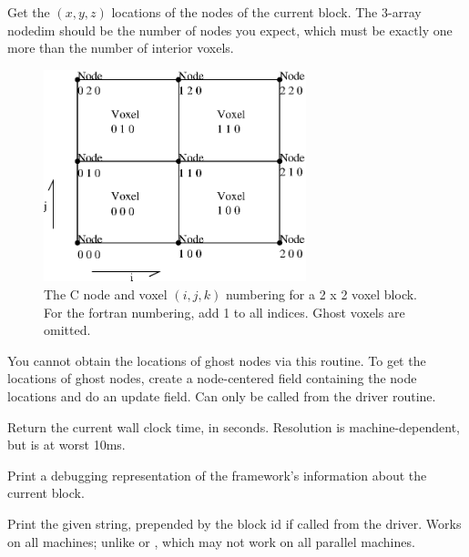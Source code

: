 \documentclass[10pt]{article}
\begin{document}
\vspace{0.2in}
Get the $(x,y,z)$ locations of the nodes of the current block. 
The 3-array nodedim should be the number of nodes you expect,
which must be exactly one more than the number of interior voxels.

\begin{figure}[h]
\begin{center}
\includegraphics[width=3in]{fig/nodeloc}
\end{center}
\caption{The C node and voxel $(i,j,k)$ numbering for a 2 x 2 voxel block.
For the fortran numbering, add 1 to all indices.
Ghost voxels are omitted.}
\label{fig:indexing}
\end{figure}

You cannot obtain the locations of ghost nodes via this routine.
To get the locations of ghost nodes, create a node-centered
field containing the node locations and do an update field.
Can only be called from the driver routine. 

\vspace{0.2in}

Return the current wall clock time, in seconds.  Resolution is
     machine-dependent, but is at worst 10ms.

\vspace{0.2in}
Print a debugging representation of the framework's information
about the current block.

\vspace{0.2in}
     Print the given string, prepended by the block id if called from the 
     driver. Works on all machines; unlike  or
     , which may not work on all parallel machines.
\end{document}
